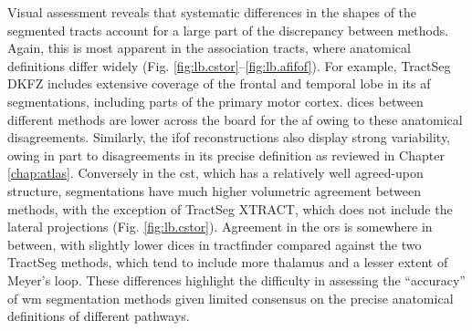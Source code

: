 Visual assessment reveals that systematic differences in the shapes of the segmented tracts account for a large part of the discrepancy between methods.
Again, this is most apparent in the association tracts, where anatomical definitions differ widely (Fig. \ref{fig:lb.cstor}--\ref{fig:lb.afifof}).
For example, TractSeg DKFZ includes extensive coverage of the frontal and temporal lobe in its \gls{af} segmentations, including parts of the primary motor cortex.
\Glspl{dice} between different methods are lower across the board for the \gls{af} owing to these anatomical disagreements.
Similarly, the \gls{ifof} reconstructions also display strong variability, owing in part to disagreements in its precise definition as reviewed in Chapter \ref{chap:atlas}.
Conversely in the \gls{cst}, which has a relatively well agreed-upon structure, segmentations have much higher volumetric agreement between methods, with the exception of TractSeg XTRACT, which does not include the lateral projections (Fig. \ref{fig:lb.cstor}).
Agreement in the \glspl{or} is somewhere in between, with slightly lower \glspl{dice} in tractfinder compared against the two TractSeg methods, which tend to include more thalamus and a lesser extent of Meyer's loop.
These differences highlight the difficulty in assessing the ``accuracy'' of \gls{wm} segmentation methods given limited consensus on the precise anatomical definitions of different pathways.


